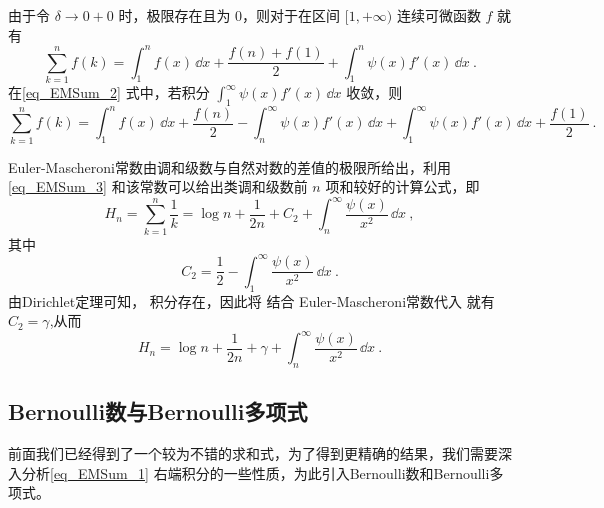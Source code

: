 由于令 $\delta\to0+0$ 时，极限存在且为 $0$，则对于在区间 $[1,+\infty)$ 连续可微函数 $f$ 就有
\begin{equation}\label{eq_EMSum_2}
    \sum_{k=1}^{n}f(k)
    =\int_{1}^{n}f(x)\,\dd x+\frac{f(n)+f(1)}{2}+\int_{1}^{n}\psi(x)f'(x)\,\dd x~.
\end{equation}
在\autoref{eq_EMSum_2}  式中，若积分 $\displaystyle{\int_{1}^{\infty}\psi(x)f'(x)\,\dd x}$ 收敛，则
\begin{equation}\label{eq_EMSum_3}
    \sum_{k=1}^{n}f(k)=\int_{1}^{n}f(x)\,\dd x
    +\frac{f(n)}{2}-\int_{n}^{\infty}\psi(x)f'(x)\,\dd x
    +\int_{1}^{\infty}\psi(x)f'(x)\,\dd x+\frac{f(1)}{2}~.
\end{equation}
\begin{example}{}
Euler-Mascheroni常数由调和级数与自然对数的差值的极限所给出，利用\autoref{eq_EMSum_3} 和该常数可以给出类调和级数前 $n$ 项和较好的计算公式，即
\begin{equation}
    H_{n}=\sum_{k=1}^{n}\frac{1}{k}=\log n+\frac{1}{2n}+C_{2}
    +\int_{n}^{\infty}\frac{\psi(x)}{x^2}\,\dd x~,
\end{equation}
其中
\begin{equation}
    C_{2}=\frac{1}{2}-\int_{1}^{\infty}\frac{\psi(x)}{x^2}\,\dd x~.
\end{equation}
由Dirichlet定理可知， 积分存在，因此将 结合
Euler-Mascheroni常数代入 就有 $C_{2}=\gamma$,从而
\begin{equation}
    H_{n}=\log n+\frac{1}{2n}+\gamma+\int_{n}^{\infty}\frac{\psi(x)}{x^2}\,\dd x~.
\end{equation}
\end{example}

\subsection{Bernoulli数与Bernoulli多项式}

前面我们已经得到了一个较为不错的求和式，为了得到更精确的结果，我们需要深入分析\autoref{eq_EMSum_1} 右端积分的一些性质，为此引入Bernoulli数和Bernoulli多项式。

